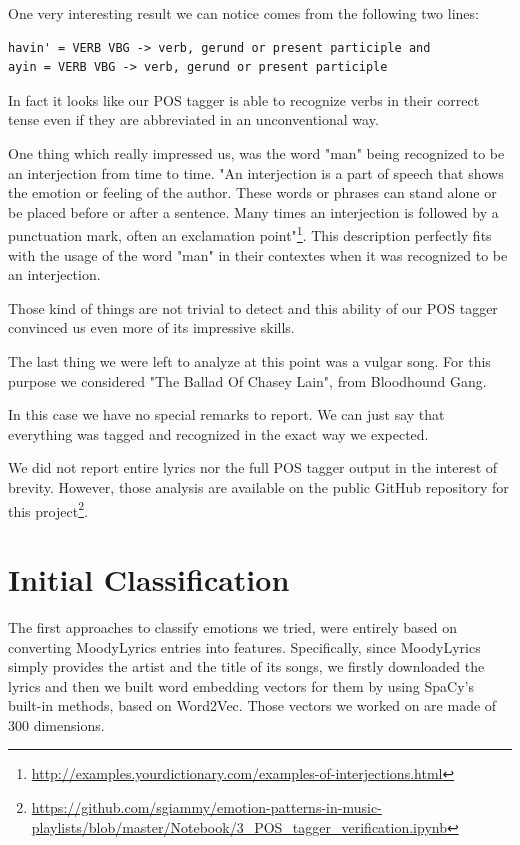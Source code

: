 One very interesting result we can notice comes from the following two lines:
\begin{lstlisting}
havin' = VERB VBG -> verb, gerund or present participle and
ayin = VERB VBG -> verb, gerund or present participle
\end{lstlisting}

In fact it looks like our POS tagger is able to recognize verbs in their correct tense
even if they are abbreviated in an unconventional way.

One thing which really impressed us, was the word "man" being recognized to be an interjection from time to time. 
"An interjection is a part of speech that shows the emotion or feeling of the author. These words or phrases can 
stand alone or be placed before or after a sentence. Many times an interjection is followed 
by a punctuation mark, often an exclamation point"\footnote{\url{http://examples.yourdictionary.com/examples-of-interjections.html}}. 
This description perfectly fits with the usage of the word "man" in their contextes when it was recognized to be an interjection. 

Those kind of things are not trivial to detect and this ability of our POS tagger convinced us even more
of its impressive skills.

The last thing we were left to analyze at this point was a vulgar song. For this purpose we considered 
"The Ballad Of Chasey Lain", from Bloodhound Gang. 

In this case we have no special remarks to report. We can just say that everything was tagged and
recognized in the exact way we expected.

We did not report entire lyrics nor the full POS tagger output in the interest of brevity. However, those
analysis are available on the public GitHub repository for this project\footnote{\url{https://github.com/sgiammy/emotion-patterns-in-music-playlists/blob/master/Notebook/3\_POS\_tagger\_verification.ipynb}}.

\section{Initial Classification}

The first approaches to classify emotions we tried, were entirely based on converting
MoodyLyrics entries into features. Specifically, since MoodyLyrics simply provides the
artist and the title of its songs, we firstly downloaded the lyrics and then we built
word embedding vectors for them by using SpaCy's built-in methods, based on Word2Vec.
Those vectors we worked on are made of 300 dimensions.

